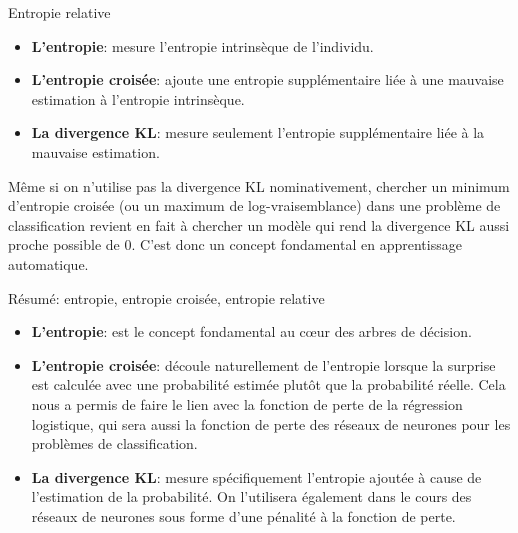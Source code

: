 \begin{frame}{Entropie relative}
	\begin{itemize}
		\item \textbf{L'entropie}: mesure l'entropie intrinsèque de l'individu.
		\item \textbf{L'entropie croisée}: ajoute une entropie supplémentaire liée à une mauvaise estimation à l'entropie intrinsèque.
		\item \textbf{La divergence KL}: mesure seulement l'entropie supplémentaire liée à la mauvaise estimation.
	\end{itemize}
	\pause
	\vspace{0.5cm}
	Même si on n'utilise pas la divergence KL nominativement, chercher un minimum d'entropie croisée (ou un maximum de log-vraisemblance) dans une problème de classification revient en fait à chercher un modèle qui rend la divergence KL aussi proche possible de 0. C'est donc un concept fondamental en apprentissage automatique.
\end{frame}

\begin{frame}{Résumé: entropie, entropie croisée, entropie relative}
	\begin{itemize}
		\item \textbf{L'entropie}: est le concept fondamental au cœur des arbres de décision.
		\item \textbf{L'entropie croisée}: découle naturellement de l'entropie lorsque la surprise est calculée avec une probabilité estimée plutôt que la probabilité réelle. Cela nous a permis de faire le lien avec la fonction de perte de la régression logistique, qui sera aussi la fonction de perte des réseaux de neurones pour les problèmes de classification.
		\item \textbf{La divergence KL}: mesure spécifiquement l'entropie ajoutée à cause de l'estimation de la probabilité. On l'utilisera également dans le cours des réseaux de neurones sous forme d'une pénalité à la fonction de perte.
	\end{itemize}
\end{frame}